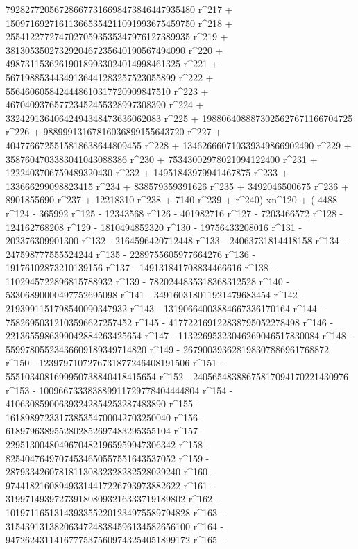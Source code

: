        792827720567286677316698473846447935480 r^217 + 
       150971692716113665354211091993675459750 r^218 + 
       25541227727470270593535347976127389935 r^219 + 
       3813053502732920467235640190567494090 r^220 + 
       498731153626190189933024014998461325 r^221 + 
       56719885344349136441283257523055899 r^222 + 
       5564606058424448610317720909847510 r^223 + 
       467040937657723452455328997308390 r^224 + 
       33242913640642494348473636062083 r^225 + 
       1988064088873025627671166704725 r^226 + 
       98899913167816036899155643720 r^227 + 
       4047766725515818638644809455 r^228 + 
       134626660710339349866902490 r^229 + 
       3587604703383041043088386 r^230 + 
       75343002978021094122400 r^231 + 1222403706759489320430 r^232 + 
       14951843979941467875 r^233 + 133666299098823415 r^234 + 
       838579359391626 r^235 + 3492046500675 r^236 + 
       8901855690 r^237 + 12218310 r^238 + 7140 r^239 + 
       r^240) xn^120 + (-4488 r^124 - 365992 r^125 - 12343568 r^126 - 
       401982716 r^127 - 7203466572 r^128 - 124162768208 r^129 - 
       1810494852320 r^130 - 19756433208016 r^131 - 
       202376309901300 r^132 - 2164596420712448 r^133 - 
       24063731814418158 r^134 - 247598777555524244 r^135 - 
       2289755605977664276 r^136 - 19176102873210139156 r^137 - 
       149131841708834466616 r^138 - 1102945722896815788932 r^139 - 
       7820244835318368312528 r^140 - 53306890000497752695098 r^141 - 
       349160318011921479683454 r^142 - 
       2193991151798540090347932 r^143 - 
       13190664003884667336170164 r^144 - 
       75826950312103596627257452 r^145 - 
       417722169122838795052278498 r^146 - 
       2213655986399042884263425654 r^147 - 
       11322695323046269046517830084 r^148 - 
       55997805523436609189349714820 r^149 - 
       267900393628198307886961768872 r^150 - 
       1239797107276731877246408191506 r^151 - 
       5551034081699950738840418415654 r^152 - 
       24056548388675817094170221430976 r^153 - 
       100966733383889911729778404444804 r^154 - 
       410630859006393242854253287483890 r^155 - 
       1618989723317385354700042703250040 r^156 - 
       6189796389552802852697483295355104 r^157 - 
       22951300480496704821965959947306342 r^158 - 
       82540476497074534650557551643537052 r^159 - 
       287933426078181130832328282528029240 r^160 - 
       974418216089493314417226793973882622 r^161 - 
       3199714939727391808093216333719189802 r^162 - 
       10197116513143933552201234975589794828 r^163 - 
       31543913138206347248384596134582656100 r^164 - 
       94726243114167775375609743254051899172 r^165 - 
